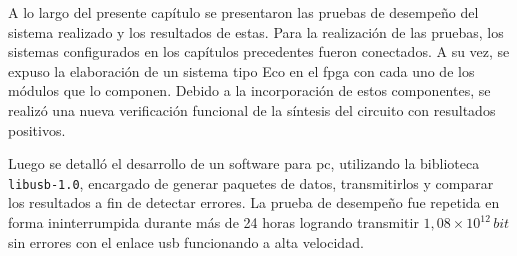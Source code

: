 A lo largo del presente capítulo se presentaron las pruebas de desempeño del sistema realizado y los resultados de estas. Para la realización de las pruebas, los sistemas configurados en los capítulos precedentes fueron conectados. A su vez, se expuso la elaboración de un sistema tipo Eco en el \acrshort{fpga} con cada uno de los módulos que lo componen. Debido a la incorporación de estos componentes, se realizó una nueva verificación funcional de la síntesis del circuito con resultados positivos.

Luego se detalló el desarrollo de un software para \acrshort{pc}, utilizando la biblioteca \verb|libusb-1.0|, encargado de generar paquetes de datos, transmitirlos y comparar los resultados a fin de detectar errores. La prueba de desempeño fue repetida en forma ininterrumpida durante más de 24 horas logrando transmitir $1,08\times10^{12}\,bit$ sin errores con el enlace \acrshort{usb} funcionando a alta velocidad. 